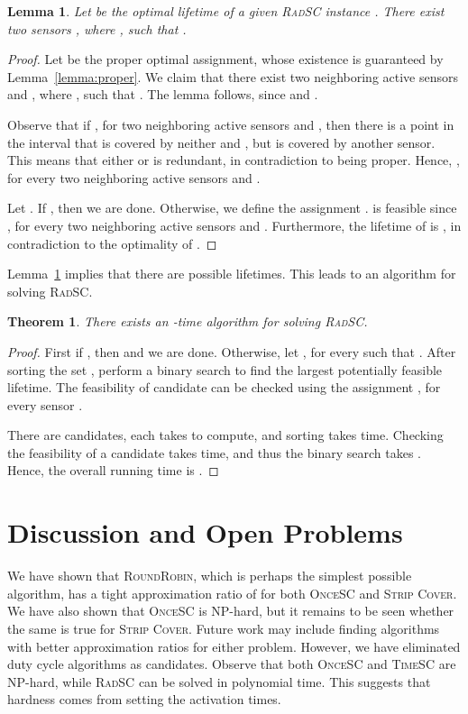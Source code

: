 \documentclass[11pt]{article}
\newtheorem{lemma}{Lemma}
\newtheorem{theorem}{Theorem}
\newcommand{\strip}{\textsc{Strip Cover}\xspace}
\newcommand{\sosc}{\textsc{OnceSC}\xspace}
\newcommand{\srsc}{\textsc{RadSC}\xspace}
\newcommand{\stsc}{\textsc{TimeSC}\xspace}
\newcommand{\rr}{\textsc{RoundRobin}\xspace}
\begin{document}
\begin{lemma}
\label{lemma:pair}
Let  be the optimal lifetime of a given \srsc instance .
There exist two sensors , where ,
such that .
\end{lemma}
\begin{proof}Let  be the proper optimal assignment, whose existence is
guaranteed by Lemma~\ref{lemma:proper}.  We claim that there exist two
neighboring active sensors  and , where , such that .  The lemma follows, since  and
.

Observe that if , for two neighboring
active sensors  and , then there is a point in the interval
 that is covered by neither  and , but is covered by
another sensor.  This means that either  or  is redundant, in
contradiction to  being proper. Hence, , for every two neighboring active sensors  and .

Let .  If , then we are done.  Otherwise,
we define the assignment .   is feasible
since , for every two neighboring active sensors  and
. Furthermore, the lifetime of  is , in
contradiction to the optimality of .
\end{proof}

Lemma~\ref{lemma:pair} implies that there are  possible
lifetimes.  This leads to an algorithm for solving \srsc.

\begin{theorem}
\label{thm:srsc}
There exists an -time algorithm for solving \srsc.
\end{theorem}
\begin{proof}First if , then  and we
are done.
Otherwise, let , for every  such that .  After sorting the set
, perform a binary search to find the largest
potentially feasible lifetime.  The feasibility of candidate 
can be checked using the assignment , for every sensor .

There are  candidates, each takes  to compute, and
sorting takes  time.  Checking the feasibility of a
candidate takes  time, and thus the binary search takes .  Hence, the overall running time is .
\end{proof}



\section{Discussion and Open Problems}

We have shown that \rr, which is perhaps the simplest possible
algorithm, has a tight approximation ratio of  for both
\sosc and \strip.  We have also shown that \sosc is NP-hard, but it
remains to be seen whether the same is true for \strip.  Future work
may include finding algorithms with better approximation ratios for
either problem. However, we have eliminated duty cycle algorithms as
candidates.
Observe that both \sosc and \stsc are NP-hard, while \srsc can be
solved in polynomial time.  This suggests that hardness comes from
setting the activation times.
\end{document}
